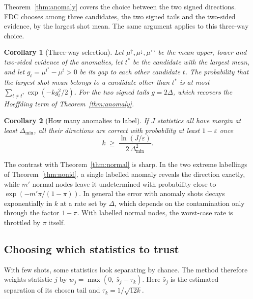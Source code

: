 \documentclass[pdflatex,sn-mathphys-ay]{sn-jnl}
\theoremstyle{plain}
\newtheorem{corollary}{Corollary}
\theoremstyle{remark}
\begin{document}
Theorem~\ref{thm:anomaly} covers the choice between the two signed directions. FDC chooses among three candidates, the two signed tails and the two-sided evidence, by the largest shot mean. The same argument applies to this three-way choice.

\begin{corollary}[Three-way selection]\label{cor:three}
Let $\mu^{\uparrow}, \mu^{\downarrow}, \mu^{\leftrightarrow}$ be the mean upper, lower and two-sided evidence of the anomalies, let $t^{*}$ be the candidate with the largest mean, and let $g_t = \mu^{t^*} - \mu^{t} > 0$ be its gap to each other candidate $t$. The probability that the largest shot mean belongs to a candidate other than $t^*$ is at most $\sum_{t \ne t^*} \exp(-k g_t^2/2)$. For the two signed tails $g = 2\Delta$, which recovers the Hoeffding term of Theorem~\ref{thm:anomaly}.
\end{corollary}

\begin{corollary}[How many anomalies to label]\label{cor:k}
If $J$ statistics all have margin at least $\Delta_{\min}$, all their directions are correct with probability at least $1-\varepsilon$ once
\[
k \;\ge\; \frac{\ln(J/\varepsilon)}{2\,\Delta_{\min}^{2}}.
\]
\end{corollary}

The contrast with Theorem~\ref{thm:normal} is sharp. In the two extreme labellings of Theorem~\ref{thm:nonid}, a single labelled anomaly reveals the direction exactly, while $m'$ normal nodes leave it undetermined with probability close to $\exp(-m'\pi/(1-\pi))$. In general the error with anomaly shots decays exponentially in $k$ at a rate set by $\Delta$, which depends on the contamination only through the factor $1-\pi$. With labelled normal nodes, the worst-case rate is throttled by $\pi$ itself.

\subsection{Choosing which statistics to trust}

With few shots, some statistics look separating by chance. The method therefore weights statistic $j$ by $w_j = \max(0,\ \hat s_j - \tau_k)$. Here $\hat s_j$ is the estimated separation of its chosen tail and $\tau_k = 1/\sqrt{12k}$.
\end{document}
